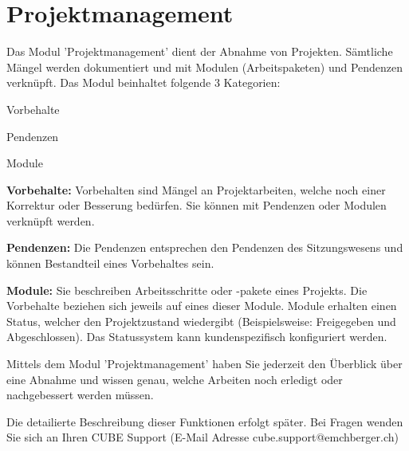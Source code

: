 
\clearpage
\section{Projektmanagement}

\vspace{\baselineskip}

Das Modul 'Projektmanagement' dient der Abnahme von Projekten. Sämtliche Mängel werden dokumentiert und mit Modulen (Arbeitspaketen) und Pendenzen verknüpft. Das Modul beinhaltet folgende 3 Kategorien:

\vspace{\baselineskip}

\begin{compactitem}
	\item Vorbehalte
	\item Pendenzen
	\item Module
\end{compactitem}

\vspace{\baselineskip}

\textbf{Vorbehalte:} Vorbehalten sind Mängel an Projektarbeiten, welche noch einer Korrektur oder Besserung bedürfen. Sie können mit Pendenzen oder Modulen verknüpft werden.

\vspace{\baselineskip}

\textbf{Pendenzen:} Die Pendenzen entsprechen den Pendenzen des Sitzungswesens und können Bestandteil eines Vorbehaltes sein. 

\vspace{\baselineskip}

\textbf{Module:} Sie beschreiben Arbeitsschritte oder -pakete eines Projekts. Die Vorbehalte beziehen sich jeweils auf eines dieser Module. Module erhalten einen Status, welcher den Projektzustand wiedergibt (Beispielsweise: Freigegeben und Abgeschlossen). Das Statussystem kann kundenspezifisch konfiguriert werden.

\vspace{\baselineskip}

Mittels dem Modul 'Projektmanagement' haben Sie jederzeit den Überblick über eine Abnahme und wissen genau, welche Arbeiten noch erledigt oder nachgebessert werden müssen.

\vspace{\baselineskip}

Die detailierte Beschreibung dieser Funktionen erfolgt später. Bei Fragen wenden Sie sich an Ihren CUBE Support (E-Mail Adresse {\color{red} cube.support@emchberger.ch})









